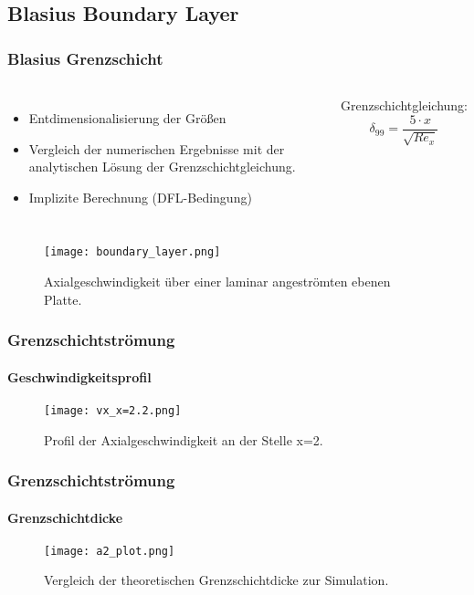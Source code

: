 \documentclass[
	11pt, %
	aspectratio=169, %
]{beamer}
\begin{document}

\subsection{Blasius Boundary Layer}
\begin{frame}
	\frametitle{Blasius Grenzschicht}
	
	\begin{columns}

		\begin{itemize}
			\item Entdimensionalisierung der Größen
			\item Vergleich der numerischen Ergebnisse mit der analytischen Lösung der Grenzschichtgleichung.
			\item Implizite Berechnung (DFL-Bedingung)
		\end{itemize}
	Grenzschichtgleichung:
	\begin{equation}
		\delta_{99} = \frac{5 \cdot x}{\sqrt{Re_x}}
	\end{equation}
	\end{columns}
	



	\begin{center}
		\begin{figure}
			\texttt{[image: boundary\_layer.png]}
			\caption{Axialgeschwindigkeit über einer laminar angeströmten ebenen Platte.}
		\end{figure}
	\end{center}
\end{frame}

\begin{frame}
	\frametitle{Grenzschichtströmung}
	\framesubtitle{Geschwindigkeitsprofil}
	\begin{center}
		\begin{figure}
			\texttt{[image: vx\_x=2.2.png]}
			\caption{Profil der Axialgeschwindigkeit an der Stelle x=2.}
		\end{figure}
	\end{center}
\end{frame}

\begin{frame}
	\frametitle{Grenzschichtströmung}
	\framesubtitle{Grenzschichtdicke}
	\begin{center}
		\begin{figure}
			\texttt{[image: a2\_plot.png]}
			\caption{Vergleich der theoretischen Grenzschichtdicke zur Simulation.}
		\end{figure}
	\end{center}
\end{frame}
\end{document}
